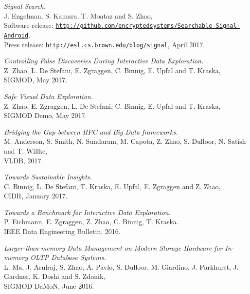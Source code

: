\documentclass[letterpaper]{article}
\renewenvironment{itemize}{
  \begin{list}{}{
    \setlength{\leftmargin}{1.5em}
  }
}{
  \end{list}
}
\begin{document}
\begin{itemize}

\item \textit{Signal Search.} \\
  J. Engelman, S. Kamara, T. Moataz and S. Zhao, \\
  Software release: \href{http://github.com/encryptedsystems/Searchable-Signal-Android}{\tt http://github.com/encryptedsystems/Searchable-Signal-Android}. \\
  Press release: \href{http://esl.cs.brown.edu/blog/signal}{\tt http://esl.cs.brown.edu/blog/signal}, April 2017.

\item \textit{Controlling False Discoveries During Interactive Data Exploration.} \\
  Z. Zhao, L. De Stefani, E. Zgraggen, C. Binnig, E. Upfal and T. Kraska, \\
  SIGMOD, May 2017.

\item \textit{Safe Visual Data Exploration.} \\
  Z. Zhao, E. Zgraggen, L. De Stefani, C. Binnig, E. Upfal and T. Kraska, \\
  SIGMOD Demo, May 2017.

\item \textit{Bridging the Gap between HPC and Big Data frameworks.} \\
  M. Anderson, S. Smith, N. Sundaram, M. Capota, Z. Zhao, S. Dulloor, N. Satish and T. Willke, \\
  VLDB, 2017.

\item \textit{Towards Sustainable Insights.} \\
  C. Binnig, L. De Stefani, T. Kraska, E. Upfal, E. Zgraggen and Z. Zhao, \\
  CIDR, January 2017.

\item \textit{Towards a Benchmark for Interactive Data Exploration.} \\
  P. Eichmann, E. Zgraggen, Z. Zhao, C. Binnig, T. Kraska. \\
   IEEE Data Engineering Bulletin, 2016.

\item \textit{Larger-than-memory Data Management on Modern Storage Hardware for In-memory OLTP Database Systems.} \\
  L. Ma, J. Arulraj, S. Zhao, A. Pavlo, S. Dulloor, M. Giardino, J. Parkhurst, J. Gardner, K. Doshi and S. Zdonik, \\
  SIGMOD DaMoN, June 2016.


\end{itemize}
\end{document}
